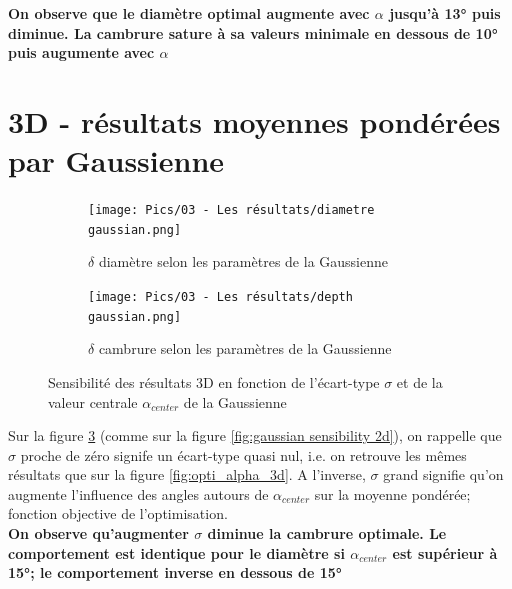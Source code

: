 


\textbf{On observe que le diamètre optimal augmente avec $\alpha$ jusqu'à 13° puis diminue. La cambrure sature à sa valeurs minimale en dessous de 10° puis augumente avec $\alpha$ }


\section{3D - résultats moyennes pondérées par Gaussienne}
\label{sec:Ch3.4}

\begin{figure}[H]
    \centering
    \begin{subfigure}[b]{0.45\textwidth}
        \centering
        \texttt{[image: Pics/03 - Les résultats/diametre gaussian.png]}
        \caption{$\delta$ diamètre selon les paramètres de la Gaussienne}
        \label{fig:diametre gaussien}
    \end{subfigure}
    \hfill
    \begin{subfigure}[b]{0.45\textwidth}
        \centering
        \texttt{[image: Pics/03 - Les résultats/depth gaussian.png]}
        \caption{$\delta$ cambrure selon les paramètres de la Gaussienne}
        \label{fig:cambrure gaussien}
    \end{subfigure}
    \caption{Sensibilité des résultats 3D en fonction de l'écart-type $\sigma$ et de la valeur centrale $\alpha_{center}$ de la Gaussienne}
    \label{fig:gaussian sensibility}
\end{figure}


Sur la figure \ref{fig:gaussian sensibility} (comme sur la figure \ref{fig:gaussian sensibility 2d}), on rappelle que $\sigma$ proche de zéro signife un écart-type quasi nul, i.e. on retrouve les mêmes résultats que sur la figure \ref{fig:opti_alpha_3d}. A l'inverse, $\sigma$ grand signifie qu'on augmente l'influence des angles autours de $\alpha_{center}$ sur la moyenne pondérée; fonction objective de l'optimisation. \\

\textbf{ On observe qu'augmenter $\sigma$ diminue la cambrure optimale. Le comportement est identique pour le diamètre si $\alpha_{center}$ est supérieur à 15°; le comportement inverse en dessous de 15°}
    

